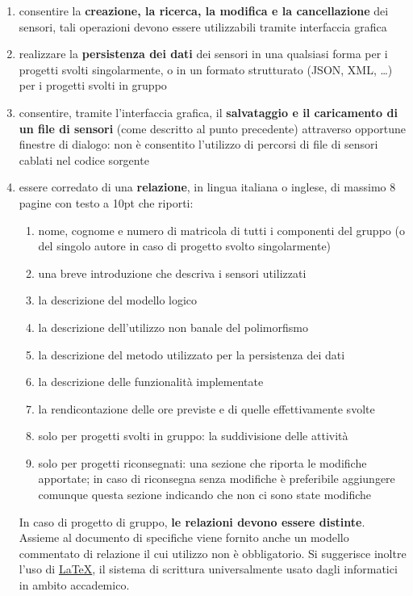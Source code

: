 \documentclass[10pt,a4paper,oneside]{article}
\begin{document}
\begin{enumerate}
 \item consentire la \textbf{creazione, la ricerca, la modifica e la cancellazione} dei sensori, tali operazioni devono essere utilizzabili tramite interfaccia grafica
 \item realizzare la \textbf{persistenza dei dati} dei sensori in una qualsiasi forma per i progetti svolti singolarmente, o in un formato strutturato (JSON, XML, \ldots) per i progetti svolti in gruppo
 \item consentire, tramite l'interfaccia grafica, il \textbf{salvataggio e il caricamento di  un file di sensori} (come descritto al punto precedente) attraverso opportune finestre di dialogo: non è consentito l'utilizzo di percorsi di file di sensori cablati nel codice sorgente
 \item essere corredato di una \textbf{relazione}, in lingua italiana o inglese, di massimo 8 pagine con testo a 10pt che riporti:
 \begin{enumerate}
  \item nome, cognome e numero di matricola di tutti i componenti del gruppo (o del singolo autore in caso di progetto svolto singolarmente)
  \item una breve introduzione che descriva i sensori utilizzati
  \item la descrizione del modello logico
  \item la descrizione dell'utilizzo non banale del polimorfismo
  \item la descrizione del metodo utilizzato per la persistenza dei dati
  \item la descrizione delle funzionalità implementate
  \item la rendicontazione delle ore previste e di quelle effettivamente svolte
  \item solo per progetti svolti in gruppo: la suddivisione delle attività
  \item solo per progetti riconsegnati: una sezione che riporta le modifiche apportate; in caso di riconsegna senza modifiche è preferibile aggiungere comunque questa sezione indicando che non ci sono state modifiche
 \end{enumerate}
 In caso di progetto di gruppo, \textbf{le relazioni devono essere distinte}. Assieme al documento di specifiche viene fornito anche un modello commentato di relazione il cui utilizzo non è obbligatorio. Si suggerisce inoltre l'uso di \href{https://it.wikipedia.org/wiki/LaTeX}{LaTeX}, il sistema di scrittura universalmente usato dagli informatici in ambito accademico.
\end{enumerate}
\end{document}
